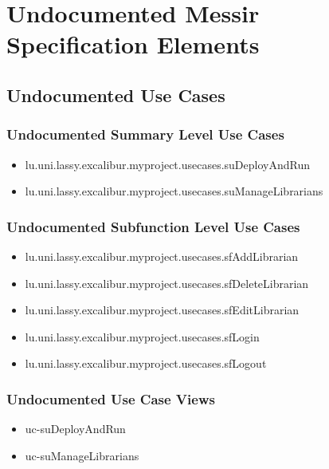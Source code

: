 	
\chapter{Undocumented Messir Specification Elements}


\section[Undocumented Use Cases]{Undocumented Use Cases}

\subsection[Undocumented Use Cases - Summary Level]{Undocumented Summary Level Use Cases}
\begin{itemize}
\item lu.uni.lassy.excalibur.myproject.usecases.suDeployAndRun 
\item lu.uni.lassy.excalibur.myproject.usecases.suManageLibrarians 
\end{itemize}


\subsection[Undocumented Use Cases - Subfunction Level]{Undocumented Subfunction Level Use Cases}
\begin{itemize}
\item lu.uni.lassy.excalibur.myproject.usecases.sfAddLibrarian 
\item lu.uni.lassy.excalibur.myproject.usecases.sfDeleteLibrarian 
\item lu.uni.lassy.excalibur.myproject.usecases.sfEditLibrarian 
\item lu.uni.lassy.excalibur.myproject.usecases.sfLogin 
\item lu.uni.lassy.excalibur.myproject.usecases.sfLogout 
\end{itemize}

\subsection[Undocumented Use Case Views]{Undocumented Use Case Views}
\begin{itemize}
\item uc-suDeployAndRun 
\item uc-suManageLibrarians 
\end{itemize}




